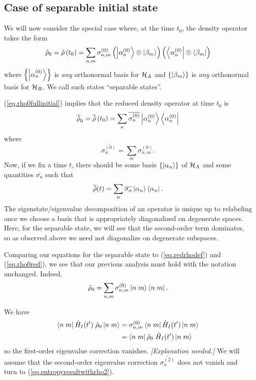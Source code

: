 \subsection{Case of separable initial state}\label{sec.separablestate}

We will now consider the special case where, at the time \(t_0\), the density operator takes the form
\begin{equation}\label{eq.rho0fullinitial}
\hat{\rho}_0 = \hat{\rho}\left(t_0\right) = \sum_{n,m} \sigma_{n,m}^{(0)} \left(\left|\alpha_n^{(0)}\right\rangle\otimes\left|\beta_m\right\rangle\right) \left(\left\langle\alpha_n^{(0)}\right|\otimes\left\langle\beta_m\right|\right)
\end{equation}
where \(\left\{\left|\alpha_n^{(0)}\right\rangle\right\}\) is \emph{any} orthonormal basis for \(\mathcal{H}_A\) and \(\left\{\left|\beta_m\right\rangle\right\}\) is \emph{any} orthonormal basis for \(\mathcal{H}_B\). We call such states ``separable states''.

(\ref{eq.rho0fullinitial}) implies that the reduced density operator at time \(t_0\) is
\[
\overline{\hat{\rho}}_0 = \overline{\hat{\rho}}\left(t_0\right) = \sum_n \overline{\sigma_{n}^{(0)}} \left|\alpha_n^{(0)}\right\rangle\left\langle\alpha_n^{(0)}\right|
\]
where
\[
\overline{\sigma_n^{(0)}} = \sum_m \sigma_{n,m}^{(0)}.
\]
Now, if we fix a time \(t\), there should be some basis \(\{\left|\alpha_n\right\rangle\}\) of \(\mathcal{H}_A\) and some quantities \(\overline{\sigma_n}\) such that
\[
\overline{\hat{\rho}}(t) = \sum_n \overline{\sigma_n} \left|\alpha_n\right\rangle\left\langle\alpha_n\right|.
\]
The eigenstate/eigenvalue decomposition of an operator is unique up to relabeling once we choose a basis that is appropriately diagonalized on degenerate spaces. Here, for the separable state, we will see that the second-order term dominates, so as observed above we need not diagonalize on degenerate subspaces.

Comparing our equations for the separable state to (\ref{eq.redrhodef}) and (\ref{eq.rho0red}), we see that our previous analysis must hold with the notation unchanged. Indeed,
\begin{equation}
\label{eq.rho0full}
\hat{\rho}_0 = \sum_{n,m} \sigma_{n,m}^{(0)} \left|n\;m\right\rangle\left\langle n\;m\right|.
\end{equation}

We have
\begin{align*}
\left\langle n\;m\right| \hat{H}_I(t^\prime) \;\hat{\rho}_0 \left|n\;m\right\rangle 
&= 
\sigma_{n,m}^{(0)} \left\langle n\;m\right| \hat{H}_I(t^\prime) \left|n\;m\right\rangle 
\\&=
 \left\langle n\;m\right| \hat{\rho}_0 \;\hat{H}_I(t^\prime) \left|n\;m\right\rangle 
\end{align*}
so the first-order eigenvalue correction vanishes. \emph{[Explanation needed.]} We will assume that the second-order eigenvalue correction \(\overline{\sigma_n^{(2)}}\) does not vanish and turn to (\ref{eq.entropyresultwithrho2}).


